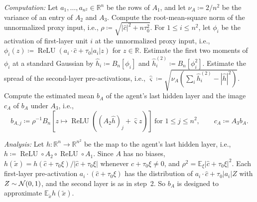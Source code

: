 \documentclass[10pt]{article}
\newcommand{\RR}{\mathbb{R}}
\newcommand{\EE}{\mathbb{E}}
\newcommand{\relu}{\operatorname{ReLU}}
\newcommand{\chat}{\hat c}
\begin{document}
\begin{enumerate}[leftmargin=*,itemsep=8pt,topsep=10pt plus 2pt]
  \emph{Computation:} Let $a_1,\dots,a_{n^2}\in\RR^n$ be the rows of $A_1$, and
  let $\nu_A\coloneqq 2/n^2$ be the variance of an entry of $A_2$ and $A_3$.
  Compute the root-mean-square norm of the unnormalized proxy
  input, i.e., $\rho\coloneqq \sqrt{|\chat|^2+n\tau_0^2}$. For
  $1\le i\le n^2$, let $\phi_i$ be the activation of first-layer unit $i$ at the
  unnormalized proxy input, i.e., $\phi_i(z)\coloneqq \relu(a_i\cdot\chat+\tau_0|a_i|z)$
  for $z\in\RR$. Estimate the first two moments of $\phi_i$ at a standard
  Gaussian by
  $\hat h_i\coloneqq B_n[\phi_i]$ and $\hat h^{(2)}_i\coloneqq B_n[\phi_i^2]$.
  Estimate the spread of the second-layer pre-activations, i.e.,
  $\hat\varsigma\coloneqq \sqrt{\nu_A(\sum_i\hat h^{(2)}_i-|\hat h|^2)}$.
  Compute the estimated mean $b_A$ of the agent's last hidden layer and the
  image $c_A$ of $b_A$ under $A_3$, i.e.,
  \[b_{A,j}\coloneqq \rho^{-1}B_n[z\mapsto\relu((A_2\hat h)_j+\hat\varsigma z)]\ \text{for }1\le j\le n^2,\qquad
  c_A\coloneqq A_3b_A.\]

  \emph{Analysis:} Let $h:\RR^n\to\RR^{n^2}$ be the map to the agent's last
  hidden layer, i.e., $h\coloneqq \relu\circ A_2\circ\relu\circ A_1$. Since
  $A$ has no biases, $h(\tilde x)=h(\chat+\tau_0\xi)/|\chat+\tau_0\xi|$ whenever
  $\chat+\tau_0\xi\ne0$, and
  $\rho^2=\EE_\xi|\chat+\tau_0\xi|^2$. Each first-layer pre-activation
  $a_i\cdot(\chat+\tau_0\xi)$ has the distribution of
  $a_i\cdot\chat+\tau_0|a_i|Z$ with $Z\sim\mathcal{N}(0,1)$, and the second layer is
  as in step~2. So $b_A$ is designed to approximate $\EE_{\tilde x}h(\tilde x)$.


\end{enumerate}
\end{document}
